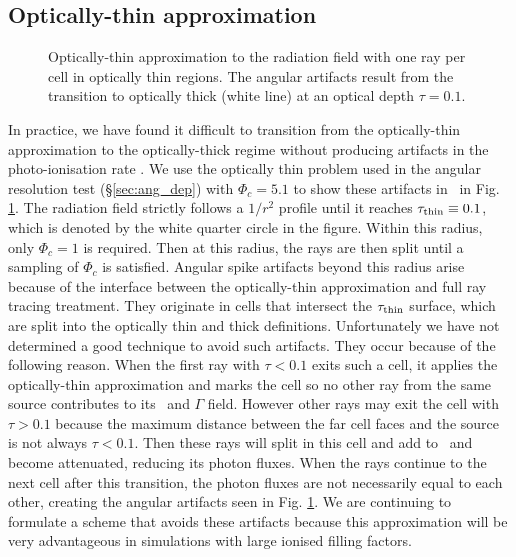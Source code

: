 \documentclass[useAMS,usenatbib]{mn2e}
\begin{document}
\subsection{Optically-thin approximation}

\begin{figure}
  \caption{\label{fig:rayopt} Optically-thin approximation to the
    radiation field with one ray per cell in optically thin regions.
    The angular artifacts result from the transition to optically
    thick (white line) at an optical depth $\tau = 0.1$.}
\end{figure}

In practice, we have found it difficult to transition from the
optically-thin approximation to the optically-thick regime without
producing artifacts in the photo-ionisation rate \kph.  We use the
optically thin problem used in the angular resolution test
(\S\ref{sec:ang_dep}) with $\Phi_c = 5.1$ to show these artifacts in
\kph~in Fig. \ref{fig:rayopt}.  The radiation field strictly follows
a $1/r^2$ profile until it reaches $\tau_{\rm thin} \equiv 0.1$, which
is denoted by the white quarter circle in the figure.  Within this
radius, only $\Phi_c = 1$ is required.  Then at this radius, the rays
are then split until a sampling of $\Phi_c$ is satisfied.  Angular
spike artifacts beyond this radius arise because of the interface
between the optically-thin approximation and full ray tracing
treatment.  They originate in cells that intersect the $\tau_{\rm
  thin}$ surface, which are split into the optically thin and thick
definitions.  Unfortunately we have not determined a good technique to
avoid such artifacts.  They occur because of the following reason.
When the first ray with $\tau < 0.1$ exits such a cell, it applies the
optically-thin approximation and marks the cell so no other ray from
the same source contributes to its \kph~and $\Gamma$ field.  However
other rays may exit the cell with $\tau > 0.1$ because the maximum
distance between the far cell faces and the source is not always $\tau
< 0.1$.  Then these rays will split in this cell and add to \kph~and
become attenuated, reducing its photon fluxes.  When the rays continue
to the next cell after this transition, the photon fluxes are not
necessarily equal to each other, creating the angular artifacts seen
in Fig. \ref{fig:rayopt}.  We are continuing to formulate a scheme
that avoids these artifacts because this approximation will be very
advantageous in simulations with large ionised filling factors.
\end{document}
